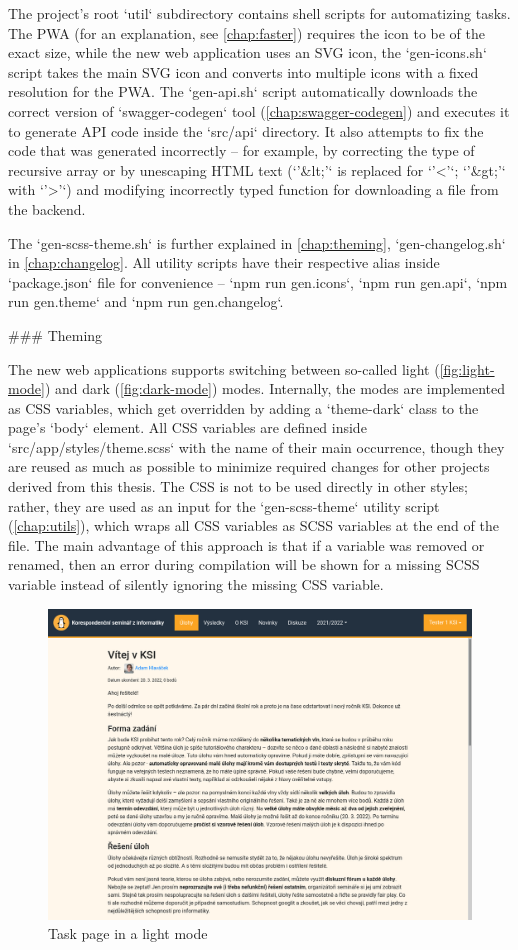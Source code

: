 \documentclass[
  digital, %
  oneside, %
  lof,     %
  nolot,     %
]{fithesis4}
\begin{document}
{The project's root `util` subdirectory contains shell scripts for automatizing tasks. The PWA (for an explanation, see \autoref{chap:faster}) requires the icon to be of the exact size, while the new web application uses an SVG icon, the `gen-icons.sh` script takes the main SVG icon and converts into multiple icons with a fixed resolution for the PWA. The `gen-api.sh` script automatically downloads the correct version of `swagger-codegen` tool (\autoref{chap:swagger-codegen}) and executes it to generate API code inside the `src/api` directory. It also attempts to fix the code that was generated incorrectly -- for example, by correcting the type of recursive array or by unescaping HTML text (`'&lt;'` is replaced for `'<'`; `'&gt;'` with `'>'`) and modifying incorrectly typed function for downloading a file from the backend.

The `gen-scss-theme.sh` is further explained in \autoref{chap:theming}, `gen-changelog.sh` in \autoref{chap:changelog}. All utility scripts have their respective alias inside `package.json` file for convenience -- `npm run gen.icons`, `npm run gen.api`, `npm run gen.theme` and `npm run gen.changelog`. 

### Theming
\label{chap:theming}

The new web applications supports switching between so-called light (\autoref{fig:light-mode}) and dark (\autoref{fig:dark-mode}) modes. Internally, the modes are implemented as CSS variables, which get overridden by adding a `theme-dark` class to the page's `body` element. All CSS variables are defined inside `src/app/styles/theme.scss` with the name of their main occurrence, though they are reused as much as possible to minimize required changes for other projects derived from this thesis. The CSS is not to be used directly in other styles; rather, they are used as an input for the `gen-scss-theme` utility script (\autoref{chap:utils}), which wraps all CSS variables as SCSS variables at the end of the file. The main advantage of this approach is that if a variable was removed or renamed, then an error during compilation will be shown for a missing SCSS variable instead of silently ignoring the missing CSS variable.

\begin{figure}
\includegraphics[width=.8\textwidth]{assets/img/light-mode}
\caption{Task page in a light mode}
\label{fig:light-mode}
\end{figure}

}
\end{document}
